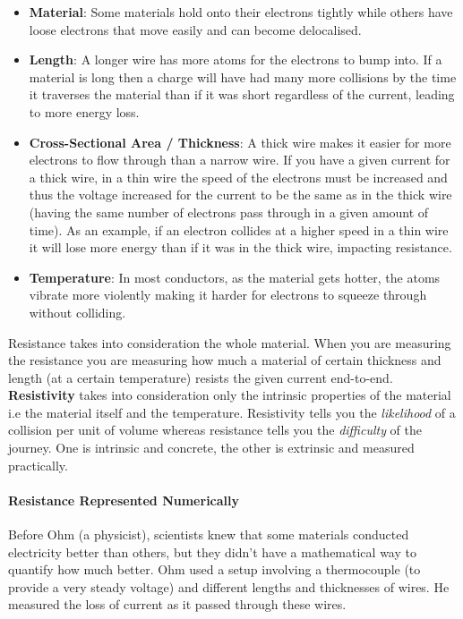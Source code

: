 \documentclass{article}
\begin{document}
\begin{itemize}
    \item \textbf{Material}: Some materials hold onto their electrons tightly while others have loose electrons that move easily and can become delocalised.
    \item \textbf{Length}: A longer wire has more atoms for the electrons to bump into. If a material is long then a charge will have had many more collisions by the time it traverses the material than if it was short regardless of the current, leading to more energy loss.
    \item \textbf{Cross-Sectional Area / Thickness}: A thick wire makes it easier for more electrons to flow through than a narrow wire. If you have a given current for a thick wire, in a thin wire the speed of the electrons must be increased and thus the voltage increased for the current to be the same as in the thick wire (having the same number of electrons pass through in a given amount of time). As an example, if an electron collides at a higher speed in a thin wire it will lose more energy than if it was in the thick wire, impacting resistance.
    \item \textbf{Temperature}: In most conductors, as the material gets hotter, the atoms vibrate more violently making it harder for electrons to squeeze through without colliding.
\end{itemize}

Resistance takes into consideration the whole material. When you are measuring the resistance you are measuring how much a material of certain thickness and length (at a certain temperature) resists the given current end-to-end. \textbf{Resistivity} takes into consideration only the intrinsic properties of the material i.e the material itself and the temperature. Resistivity tells you the \emph{likelihood} of a collision per unit of volume whereas resistance tells you the \emph{difficulty} of the journey. One is intrinsic and concrete, the other is extrinsic and measured practically.

\paragraph{Resistance Represented Numerically}

Before Ohm (a physicist), scientists knew that some materials conducted electricity better than others, but they didn't have a mathematical way to quantify how much better. Ohm used a setup involving a thermocouple (to provide a very steady voltage) and different lengths and thicknesses of wires. He measured the loss of current as it passed through these wires. 
\end{document}
